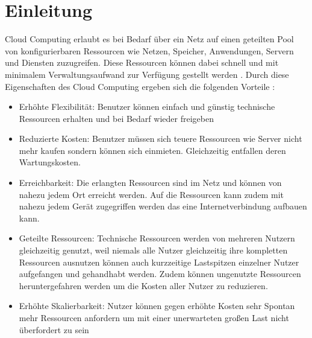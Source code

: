 \section{Einleitung}


Cloud Computing erlaubt es bei Bedarf über ein Netz auf einen geteilten Pool von konfigurierbaren Ressourcen wie Netzen, Speicher, Anwendungen, Servern und Diensten zuzugreifen. Diese Ressourcen können dabei schnell und mit minimalem Verwaltungsaufwand zur Verfügung gestellt werden \cite{mell2011}. 
Durch diese Eigenschaften des Cloud Computing ergeben sich die folgenden Vorteile \cite{ganesh2014}:
\begin{itemize}
\item 
Erhöhte Flexibilität: Benutzer können einfach und günstig technische Ressourcen erhalten und bei Bedarf wieder freigeben
\item
Reduzierte Kosten: Benutzer müssen sich teuere Ressourcen wie Server nicht mehr kaufen sondern können sich einmieten. Gleichzeitig entfallen deren Wartungskosten. 
\item
Erreichbarkeit: Die erlangten Ressourcen sind im Netz und können von nahezu jedem Ort erreicht werden. Auf die Ressourcen kann zudem mit nahezu jedem Gerät zugegriffen werden das eine Internetverbindung aufbauen kann.
\item
Geteilte Ressourcen: Technische Ressourcen werden von mehreren Nutzern gleichzeitig genutzt, weil niemals alle Nutzer gleichzeitig ihre kompletten Ressourcen ausnutzen können auch kurzzeitige Lastspitzen einzelner Nutzer aufgefangen und gehandhabt werden. Zudem können ungenutzte Ressourcen heruntergefahren werden um die Kosten aller Nutzer zu reduzieren.
\item
Erhöhte Skalierbarkeit: Nutzer können gegen erhöhte Kosten sehr Spontan mehr Ressourcen anfordern um mit einer unerwarteten großen Last nicht überfordert zu sein
\end{itemize}


